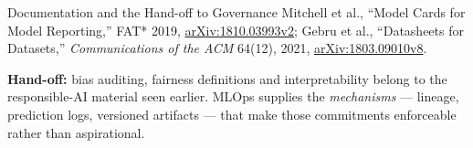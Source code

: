 \begin{frame}{Documentation and the Hand-off to Governance}
    \vspace{0.18em}
    {\scriptsize Mitchell et al., ``Model Cards for Model Reporting,'' FAT* 2019,
    \href{https://arxiv.org/abs/1810.03993v2}{arXiv:1810.03993v2};
    Gebru et al., ``Datasheets for Datasets,'' \textit{Communications of the ACM} 64(12), 2021,
    \href{https://arxiv.org/abs/1803.09010v8}{arXiv:1803.09010v8}.}

    \vspace{0.12em}
    {\scriptsize \textbf{Hand-off:} bias auditing, fairness definitions and interpretability belong
    to the responsible-AI material seen earlier. MLOps supplies the \emph{mechanisms} --- lineage,
    prediction logs, versioned artifacts --- that make those commitments enforceable rather than aspirational.}

\end{frame}
